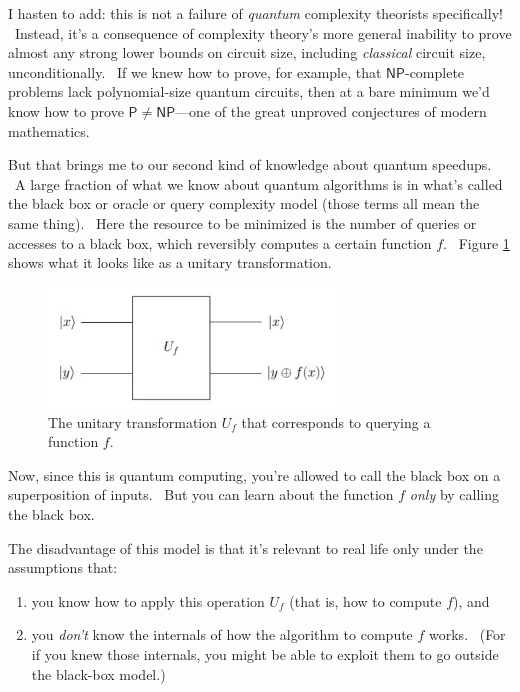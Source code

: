 \documentclass[12pt]{article}
\begin{document}
I hasten to add: this is not a failure of \emph{quantum} complexity theorists specifically! \ Instead, it's a consequence of complexity theory's more general inability to prove almost any strong lower bounds on circuit size, including \emph{classical} circuit size, unconditionally. \ If we knew how to prove, for example, that $\mathsf{NP}$-complete problems lack polynomial-size quantum circuits, then at a bare minimum we'd know how to prove $\mathsf{P} \neq \mathsf{NP}$---one of the great unproved conjectures of modern mathematics.

But that brings me to our second kind of knowledge about quantum speedups. \ A large fraction of what we know about quantum algorithms is in what's called the black box or oracle or query complexity model (those terms all mean the same thing). \ Here the resource to be minimized is the number of queries or accesses to a black box, which reversibly computes a certain function $f$. \ Figure \ref{query} shows what it looks like as a unitary transformation.

\begin{figure}
\centering
\includegraphics[width=3in]{query.jpg}
\caption{The unitary transformation $U_f$ that corresponds to querying a function $f$.}
\label{query}
\end{figure}

Now, since this is quantum computing, you're allowed to call the black box on a superposition of inputs. \ But you can learn about the function $f$ \emph{only} by calling the black box.

The disadvantage of this model is that it's relevant to real life only under the assumptions that:

\begin{enumerate}
\item[(1)] you know how to apply this operation $U_f$ (that is, how to compute $f$), and
\item[(2)] you \emph{don't} know the internals of how the algorithm to compute $f$ works. \ (For if you knew those internals, you might be able to exploit them to go outside the black-box model.)
\end{enumerate}
\end{document}
